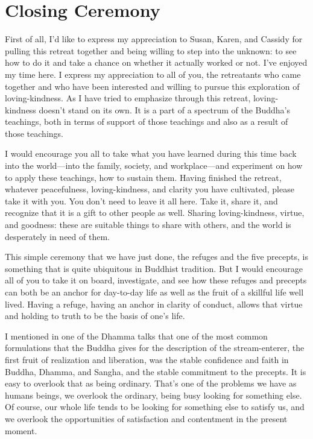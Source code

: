 \chapter{Closing Ceremony}

First of all, I’d like to express my appreciation to Susan, Karen, and
Cassidy for pulling this retreat together and being willing to step into
the unknown: to see how to do it and take a chance on whether it
actually worked or not. I’ve enjoyed my time here. I express my
appreciation to all of you, the retreatants who came together and who
have been interested and willing to pursue this exploration of
loving-kindness. As I have tried to emphasize through this retreat,
loving-kindness doesn’t stand on its own. It is a part of a spectrum of
the Buddha’s teachings, both in terms of support of those teachings and
also as a result of those teachings.

I would encourage you all to take what you have learned during this time
back into the world—into the family, society, and workplace—and
experiment on how to apply these teachings, how to sustain them. Having
finished the retreat, whatever peacefulness, loving-kindness, and
clarity you have cultivated, please take it with you. You don’t need to
leave it all here. Take it, share it, and recognize that it is a gift to
other people as well. Sharing loving-kindness, virtue, and goodness:
these are suitable things to share with others, and the world is
desperately in need of them.

This simple ceremony that we have just done, the refuges and the five
precepts, is something that is quite ubiquitous in Buddhist tradition.
But I would encourage all of you to take it on board, investigate, and
see how these refuges and precepts can both be an anchor for day-to-day
life as well as the fruit of a skillful life well lived. Having a
refuge, having an anchor in clarity of conduct, allows that virtue and
holding to truth to be the basis of one’s life.

I mentioned in one of the Dhamma talks that one of the most common
formulations that the Buddha gives for the description of the
stream-enterer, the first fruit of realization and liberation, was the
stable confidence and faith in Buddha, Dhamma, and Sangha, and the
stable commitment to the precepts. It is easy to overlook that as being
ordinary. That’s one of the problems we have as humans beings, we
overlook the ordinary, being busy looking for something else. Of course,
our whole life tends to be looking for something else to satisfy us, and
we overlook the opportunities of satisfaction and contentment in the
present moment.


